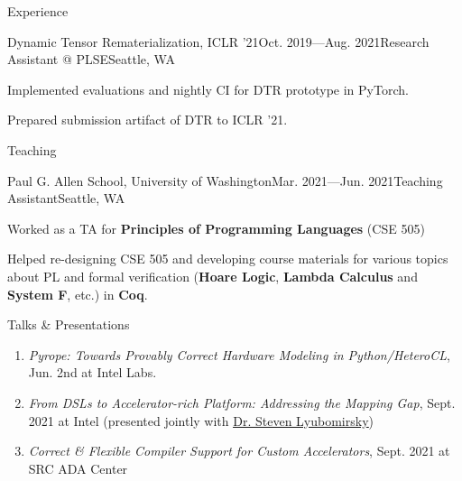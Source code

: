 \documentclass{resume}
\newcommand{\myul}[2][blue]{\setulcolor{#1}\ul{#2}\setulcolor{blue}}
\begin{document}
\begin{rSection}{Experience}
\begin{rSubsection}{Dynamic Tensor Rematerialization, ICLR '21}{Oct. 2019---Aug. 2021}{Research Assistant @ PLSE}{Seattle, WA}
            \item Implemented evaluations and nightly CI for DTR prototype in PyTorch.
            \item Prepared submission artifact of DTR to ICLR '21.
        \end{rSubsection}
    \end{rSection}
	\vspace{-5pt}
    \begin{rSection}{Teaching}
        \begin{rSubsection}{Paul G. Allen School, University of Washington}{Mar. 2021---Jun. 2021}{Teaching Assistant}{Seattle, WA}
			\item Worked as a TA for \textbf{Principles of Programming Languages} (CSE 505)
			\item Helped re-designing CSE 505 and developing course materials for various topics about PL and formal verification (\textbf{Hoare Logic}, \textbf{Lambda Calculus} and \textbf{System F}, etc.) in \textbf{Coq}.
		\end{rSubsection}
    \end{rSection}
    \vspace{-5pt}
	\begin{rSection}{Talks \& Presentations}
		\vspace{-5pt}
		\begin{enumerate}[leftmargin=5pt]
			\setlength{\itemsep}{5pt}
			\setlength{\parskip}{0pt}
			\setlength{\parsep}{0pt}
            \item \textit{Pyrope: Towards Provably Correct Hardware Modeling in Python/HeteroCL}, Jun. 2nd at Intel Labs.
			\item \textit{From DSLs to Accelerator-rich Platform: Addressing the Mapping Gap}, Sept. 2021 at Intel (presented jointly with \href{https://homes.cs.washington.edu/~sslyu/}{\color{blue} \myul {Dr. Steven Lyubomirsky}})
			\item \textit{Correct \& Flexible Compiler Support for Custom Accelerators}, Sept. 2021 at SRC ADA Center
		\end{enumerate} 
	\end{rSection}
\end{document}
